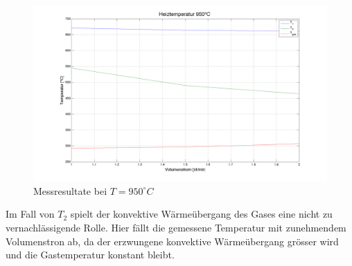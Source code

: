 \begin{figure}[H]
\includegraphics[width=\textwidth]{pics/figure2.png}
\caption{Messresultate bei $T= 950^\circ C$}
\label{pic:figure2}
\end{figure}



Im Fall von $T_2$ spielt der konvektive Wärmeübergang des Gases eine nicht zu vernachlässigende Rolle. Hier fällt die gemessene Temperatur mit zunehmendem Volumenstron ab, da der erzwungene konvektive Wärmeübergang grösser wird und die Gastemperatur konstant bleibt.\\




